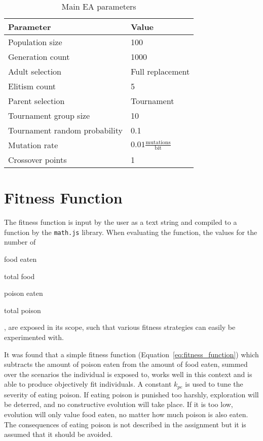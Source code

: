\documentclass[paper=a4, fontsize=11pt]{scrartcl}
\begin{document}
\begin{table}
{\scriptsize
\centering
\begin{tabular}{ll}
\toprule
Parameter                     & Value \\
\midrule
Population size               & 100 \\
Generation count              & 1000 \\
Adult selection               & Full replacement \\
Elitism count                 & 5 \\
Parent selection              & Tournament \\
Tournament group size         & 10 \\
Tournament random probability & 0.1 \\
Mutation rate                 & $0.01 \frac{\text{mutations}}{\text{bit}}$ \\
Crossover points              & 1 \\
\bottomrule
\end{tabular}
\caption{Main \ac{EA} parameters}
\label{table:ea_parameters}
}
\end{table}

\section{Fitness Function}

The fitness function is input by the user as a text string and compiled to a function by the \texttt{math.js} library. When evaluating the function, the values for the number of
\begin{enumerate*}[label={\alph*)}]
\item food eaten
\item total food
\item poison eaten
\item total poison
\end{enumerate*},
are exposed in its scope, such that various fitness strategies can easily be experimented with.

It was found that a simple fitness function (Equation~\ref{eq:fitness_function}) which subtracts the amount of poison eaten from the amount of food eaten, summed over the scenarios the individual is exposed to, works well in this context and is able to produce objectively fit individuals. A constant $k_\mathit{pe}$ is used to tune the severity of eating poison. If eating poison is punished too harshly, exploration will be deterred, and no constructive evolution will take place. If it is too low, evolution will only value food eaten, no matter how much poison is also eaten. The consequences of eating poison is not described in the assignment but it is assumed that it should be avoided.
\end{document}
